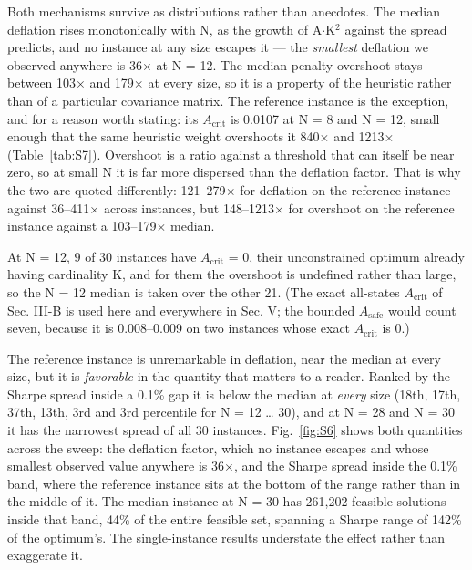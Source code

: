 \documentclass[journal]{IEEEtran}
\begin{document}
Both mechanisms survive as distributions rather than anecdotes. The median deflation rises monotonically with N, as the growth of A$\cdot$K$^{2}$ against the spread predicts, and no instance at any size escapes it --- the \textit{smallest} deflation we observed anywhere is 36$\times$ at N = 12. The median penalty overshoot stays between 103$\times$ and 179$\times$ at every size, so it is a property of the heuristic rather than of a particular covariance matrix. The reference instance is the exception, and for a reason worth stating: its $A_{\mathrm{crit}}$ is 0.0107 at N = 8 and N = 12, small enough that the same heuristic weight overshoots it 840$\times$ and 1213$\times$ (Table~\ref{tab:S7}). Overshoot is a ratio against a threshold that can itself be near zero, so at small N it is far more dispersed than the deflation factor. That is why the two are quoted differently: 121--279$\times$ for deflation on the reference instance against 36--411$\times$ across instances, but 148--1213$\times$ for overshoot on the reference instance against a 103--179$\times$ median.


At N = 12, 9 of 30 instances have $A_{\mathrm{crit}}$ = 0, their unconstrained optimum already having cardinality K, and for them the overshoot is undefined rather than large, so the N = 12 median is taken over the other 21. (The exact all-states $A_{\mathrm{crit}}$ of Sec. III-B is used here and everywhere in Sec. V; the bounded $A_{\mathrm{safe}}$ would count seven, because it is 0.008--0.009 on two instances whose exact $A_{\mathrm{crit}}$ is 0.)


The reference instance is unremarkable in deflation, near the median at every size, but it is \textit{favorable} in the quantity that matters to a reader. Ranked by the Sharpe spread inside a 0.1\% gap it is below the median at \textit{every} size (18th, 17th, 37th, 13th, 3rd and 3rd percentile for N = 12 \ldots{} 30), and at N = 28 and N = 30 it has the narrowest spread of all 30 instances. Fig.~\ref{fig:S6} shows both quantities across the sweep: the deflation factor, which no instance escapes and whose smallest observed value anywhere is 36$\times$, and the Sharpe spread inside the 0.1\% band, where the reference instance sits at the bottom of the range rather than in the middle of it. The median instance at N = 30 has 261,202 feasible solutions inside that band, 44\% of the entire feasible set, spanning a Sharpe range of 142\% of the optimum's. The single-instance results understate the effect rather than exaggerate it.
\end{document}
